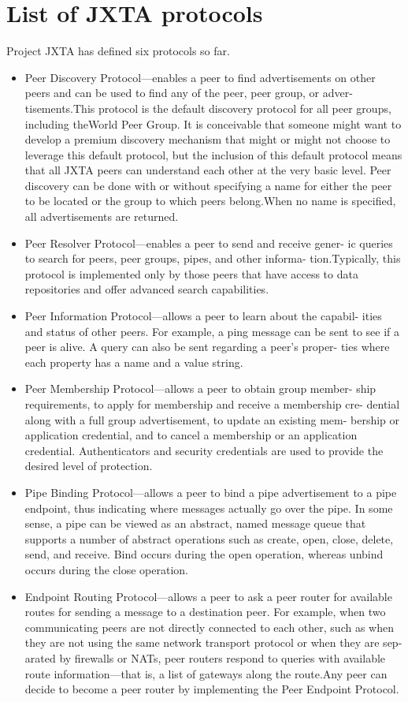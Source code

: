 \chapter{List of JXTA protocols}
\label{jxtaProtocols}

Project JXTA has defined six protocols so far.
\begin{itemize}
    \item Peer Discovery Protocol—enables a peer to find advertisements on
other peers and can be used to find any of the peer, peer group, or adver-
tisements.This protocol is the default discovery protocol for all peer groups,
including theWorld Peer Group. It is conceivable that someone might want
to develop a premium discovery mechanism that might or might not choose
to leverage this default protocol, but the inclusion of this default protocol
means that all JXTA peers can understand each other at the very basic level.
Peer discovery can be done with or without specifying a name for
either the peer to be located or the group to which peers belong.When
no name is specified, all advertisements are returned.
\item Peer Resolver Protocol—enables a peer to send and receive gener-
ic queries to search for peers, peer groups, pipes, and other informa-
tion.Typically, this protocol is implemented only by those peers that
have access to data repositories and offer advanced search capabilities.
\item Peer Information Protocol—allows a peer to learn about the capabil-
ities and status of other peers. For example, a ping message can be sent to
see if a peer is alive. A query can also be sent regarding a peer’s proper-
ties where each property has a name and a value string.
\item Peer Membership Protocol—allows a peer to obtain group member-
ship requirements, to apply for membership and receive a membership cre-
dential along with a full group advertisement, to update an existing mem-
bership or application credential, and to cancel a membership or an
application credential. Authenticators and security credentials are used to
provide the desired level of protection.
\item Pipe Binding Protocol—allows a peer to bind a pipe advertisement to
a pipe endpoint, thus indicating where messages actually go over the pipe.
In some sense, a pipe can be viewed as an abstract, named message queue
that supports a number of abstract operations such as create, open, close,
delete, send, and receive. Bind occurs during the open operation, whereas
unbind occurs during the close operation.
\item Endpoint Routing Protocol—allows a peer to ask a peer router for available
routes for sending a message to a destination peer. For example, when two
communicating peers are not directly connected to each other, such as when
they are not using the same network transport protocol or when they are sep-
arated by firewalls or NATs, peer routers respond to queries with available
route information—that is, a list of gateways along the route.Any peer can
decide to become a peer router by implementing the Peer Endpoint Protocol.
\end{itemize}